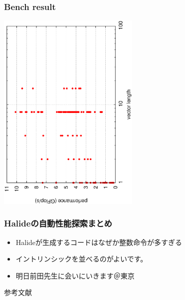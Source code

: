 \documentclass[dvipdfmx,cjk]{beamer}
\begin{document}
\begin{frame}[fragile]\frametitle{Bench result}
\begin{center}
\includegraphics[height=9.7cm,angle=270]{figure/bench_vlen.eps}
\end{center}
\end{frame}



\begin{frame}\frametitle{Halideの自動性能探索まとめ}
\begin{itemize}
\item Halideが生成するコードはなぜか整数命令が多すぎる
\item イントリンシックを並べるのがよいです。
\item 明日前田先生に会いにいきます＠東京
\end{itemize}

\end{frame}




\begin{frame}[allowframebreaks]{参考文献}{}
  
  
\end{frame}



% 
% 
% 
\end{document}
